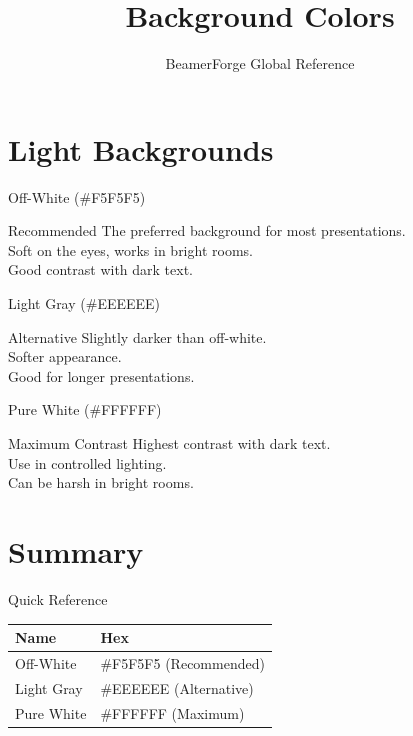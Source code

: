 \documentclass[10pt]{beamer}
\title{Background Colors}
\subtitle{BeamerForge Global Reference}
\begin{document}
\section{Light Backgrounds}

\begin{frame}{Off-White (#F5F5F5)}
\begin{block}{Recommended}
  The preferred background for most presentations.\\
  Soft on the eyes, works in bright rooms.\\
  Good contrast with dark text.
\end{block}
\end{frame}

\begin{frame}{Light Gray (#EEEEEE)}
\begin{block}{Alternative}
  Slightly darker than off-white.\\
  Softer appearance.\\
  Good for longer presentations.
\end{block}
\end{frame}

\begin{frame}{Pure White (#FFFFFF)}
\begin{block}{Maximum Contrast}
  Highest contrast with dark text.\\
  Use in controlled lighting.\\
  Can be harsh in bright rooms.
\end{block}
\end{frame}

\section{Summary}

\begin{frame}{Quick Reference}
\centering
\begin{tabular}{l l}
\toprule
\textbf{Name} & \textbf{Hex} \\
\midrule
Off-White & \#F5F5F5 (Recommended) \\
Light Gray & \#EEEEEE (Alternative) \\
Pure White & \#FFFFFF (Maximum) \\
\bottomrule
\end{tabular}
\end{frame}
\end{document}

